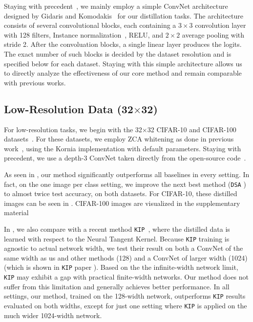 Staying with precedent~\cite{dc, dsa, dm, nguyen2021dataset}, we mainly employ a simple ConvNet architecture designed by Gidaris and Komodakis~\cite{gidaris2018dynamic} for our distillation tasks. The architecture consists of several convolutional blocks, each containing a
$3\times 3$ convolution layer with 128 filters, Instance normalization~\cite{ulyanov2016instance}, RELU, and $2\times2$ average pooling with stride 2. After the convoluation blocks, a single linear layer produces the logits. The exact number of such blocks is decided by the dataset resolution and is specified below for each dataset.
Staying with this simple architecture allows us to directly analyze the effectiveness of our core method and remain comparable with previous works.

\subsection{Low-Resolution Data (32$\times$32)}

For low-resolution tasks, we begin with the 32$\times$32 CIFAR-10 and CIFAR-100 datasets~\cite{CIFAR10}. For these datasets, we employ ZCA whitening as done in previous work~\cite{nguyen2020dataset, nguyen2021dataset}, using the Kornia \cite{kornia} implementation with default parameters.
Staying with precedent, we use a depth-3 ConvNet taken directly from the open-source code~\cite{dc, dsa}.

As seen in , our method significantly outperforms all baselines in every setting. In fact, on the one image per class setting, we  improve the next best method (\texttt{DSA} \cite{dsa}) to almost twice test accuracy, on both datasets. For CIFAR-10, these distilled images can be seen in .  CIFAR-100 images are visualized in the supplementary material

In  , we also compare with a recent method \texttt{KIP}~\cite{nguyen2020dataset,nguyen2021dataset}, where the distilled data is learned with respect to the Neural Tangent Kernel. Because \texttt{KIP} training is agnostic to actual network width, we test their result on both a ConvNet of the same width as us and other methods (128) and a ConvNet of larger width (1024) (which is shown in \texttt{KIP} paper \citep{nguyen2021dataset}).  Based on the the infinite-width network limit, \texttt{KIP} may exhibit a gap with practical finite-width networks. Our method does not suffer from this limitation and generally achieves better performance.  In all settings, our method, trained on the 128-width network, outperforms \texttt{KIP} results evaluated on both widths, except for just one setting where \texttt{KIP} is applied on the much wider 1024-width network. 

